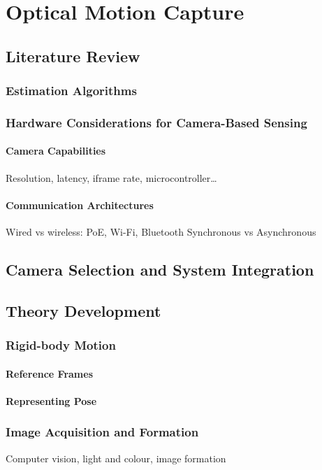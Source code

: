 \chapter{Optical Motion Capture}
\label{TrackingAlgorithm}

\section{Literature Review}
\subsection{Estimation Algorithms}
\subsection{Hardware Considerations for Camera-Based Sensing}
\subsubsection{Camera Capabilities}
Resolution, latency, iframe rate, microcontroller\dots
\subsubsection{Communication Architectures}
Wired vs wireless: PoE, Wi-Fi, Bluetooth
Synchronous vs Asynchronous

\section{Camera Selection and System Integration}

\section{Theory Development}
\subsection{Rigid-body Motion}
\subsubsection{Reference Frames}
\subsubsection{Representing Pose}

\subsection{Image Acquisition and Formation}
Computer vision, light and colour, image formation
